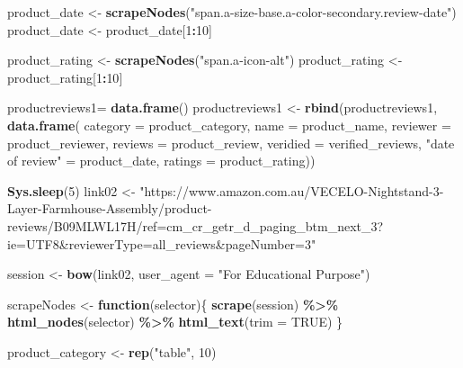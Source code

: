\documentclass[
]{article}
\newenvironment{Shaded}{\begin{snugshade}}{\end{snugshade}}
\newcommand{\AttributeTok}[1]{\textcolor[rgb]{0.13,0.29,0.53}{#1}}
\newcommand{\ConstantTok}[1]{\textcolor[rgb]{0.56,0.35,0.01}{#1}}
\newcommand{\ControlFlowTok}[1]{\textcolor[rgb]{0.13,0.29,0.53}{\textbf{#1}}}
\newcommand{\DecValTok}[1]{\textcolor[rgb]{0.00,0.00,0.81}{#1}}
\newcommand{\FunctionTok}[1]{\textcolor[rgb]{0.13,0.29,0.53}{\textbf{#1}}}
\newcommand{\NormalTok}[1]{#1}
\newcommand{\OtherTok}[1]{\textcolor[rgb]{0.56,0.35,0.01}{#1}}
\newcommand{\SpecialCharTok}[1]{\textcolor[rgb]{0.81,0.36,0.00}{\textbf{#1}}}
\newcommand{\StringTok}[1]{\textcolor[rgb]{0.31,0.60,0.02}{#1}}
\begin{document}
\begin{Shaded}
\begin{Highlighting}[]
\NormalTok{  product\_date }\OtherTok{\textless{}{-}} \FunctionTok{scrapeNodes}\NormalTok{(}\StringTok{"span.a{-}size{-}base.a{-}color{-}secondary.review{-}date"}\NormalTok{)}
\NormalTok{  product\_date }\OtherTok{\textless{}{-}}\NormalTok{ product\_date[}\DecValTok{1}\SpecialCharTok{:}\DecValTok{10}\NormalTok{]}
  
\NormalTok{  product\_rating }\OtherTok{\textless{}{-}} \FunctionTok{scrapeNodes}\NormalTok{(}\StringTok{"span.a{-}icon{-}alt"}\NormalTok{)}
\NormalTok{  product\_rating }\OtherTok{\textless{}{-}}\NormalTok{ product\_rating[}\DecValTok{1}\SpecialCharTok{:}\DecValTok{10}\NormalTok{]}
  
\NormalTok{  productreviews1}\OtherTok{=} \FunctionTok{data.frame}\NormalTok{()}
\NormalTok{  productreviews1 }\OtherTok{\textless{}{-}} \FunctionTok{rbind}\NormalTok{(productreviews1, }\FunctionTok{data.frame}\NormalTok{(}
                      \AttributeTok{category =}\NormalTok{ product\_category,}
                      \AttributeTok{name =}\NormalTok{ product\_name,}
                      \AttributeTok{reviewer =}\NormalTok{ product\_reviewer,}
                      \AttributeTok{reviews =}\NormalTok{ product\_review,}
                      \AttributeTok{veridied =}\NormalTok{ verified\_reviews,}
                      \StringTok{"date of review"} \OtherTok{=}\NormalTok{ product\_date,}
                      \AttributeTok{ratings =}\NormalTok{ product\_rating))}

  
 \FunctionTok{Sys.sleep}\NormalTok{(}\DecValTok{5}\NormalTok{)}
\NormalTok{link02 }\OtherTok{\textless{}{-}} \StringTok{"https://www.amazon.com.au/VECELO{-}Nightstand{-}3{-}Layer{-}Farmhouse{-}Assembly/product{-}reviews/B09MLWL17H/ref=cm\_cr\_getr\_d\_paging\_btm\_next\_3?ie=UTF8\&reviewerType=all\_reviews\&pageNumber=3"}


\NormalTok{  session }\OtherTok{\textless{}{-}} \FunctionTok{bow}\NormalTok{(link02,}
               \AttributeTok{user\_agent =} \StringTok{"For Educational Purpose"}\NormalTok{)}

\NormalTok{  scrapeNodes }\OtherTok{\textless{}{-}} \ControlFlowTok{function}\NormalTok{(selector)\{}
    \FunctionTok{scrape}\NormalTok{(session) }\SpecialCharTok{\%\textgreater{}\%}
      \FunctionTok{html\_nodes}\NormalTok{(selector) }\SpecialCharTok{\%\textgreater{}\%}
      \FunctionTok{html\_text}\NormalTok{(}\AttributeTok{trim =} \ConstantTok{TRUE}\NormalTok{)}
\NormalTok{  \}}

\NormalTok{  product\_category }\OtherTok{\textless{}{-}} \FunctionTok{rep}\NormalTok{(}\StringTok{"table"}\NormalTok{, }\DecValTok{10}\NormalTok{)}


\end{Highlighting}
\end{Shaded}
\end{document}
